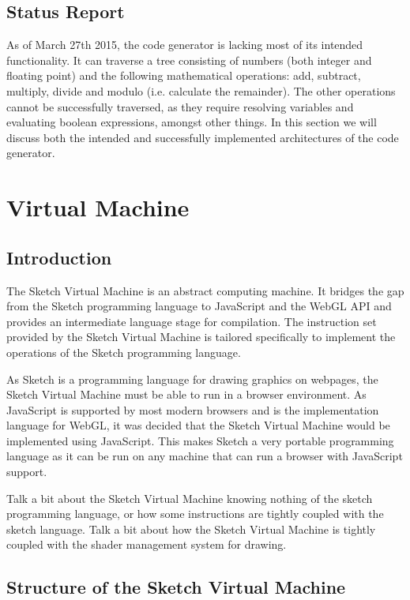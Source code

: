 \documentclass{l3proj}
\begin{document}
\subsection{Status Report}
As of March 27th 2015, the code generator is lacking most of its intended functionality. It can traverse a tree consisting of numbers (both integer and floating point) and the following mathematical operations: add, subtract, multiply, divide and modulo (i.e. calculate the remainder). The other operations cannot be successfully traversed, as they require resolving variables and evaluating boolean expressions, amongst other things. In this section we will discuss both the intended and successfully implemented architectures of the code generator.

\section{Virtual Machine}
\label{arch-abs}

\subsection{Introduction}
The Sketch Virtual Machine is an abstract computing machine. It bridges the gap from the Sketch programming language to JavaScript and the WebGL API and provides an intermediate language stage for compilation. The instruction set provided by the Sketch Virtual Machine is tailored specifically to implement the operations of the Sketch programming language.

As Sketch is a programming language for drawing graphics on webpages, the Sketch Virtual Machine must be able to run in a browser environment. As JavaScript is supported by most modern browsers and is the implementation language for WebGL, it was decided that the Sketch Virtual Machine would be implemented using JavaScript. This makes Sketch a very portable programming language as it can be run on any machine that can run a browser with JavaScript support.

Talk a bit about the Sketch Virtual Machine knowing nothing of the sketch programming language, or how some instructions are tightly coupled with the sketch language.
Talk a bit about how the Sketch Virtual Machine is tightly coupled with the shader management system for drawing.

\subsection{Structure of the Sketch Virtual Machine}
\end{document}
